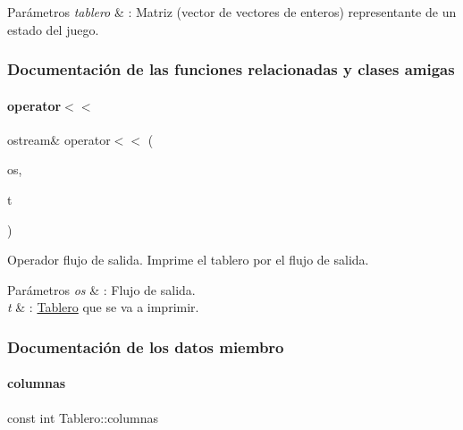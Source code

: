 \begin{DoxyParams}{Parámetros}
{\em tablero} & \+: Matriz (vector de vectores de enteros) representante de un estado del juego. \\
\hline
\end{DoxyParams}


\subsubsection{Documentación de las funciones relacionadas y clases amigas}
\hypertarget{classTablero_a320d149883604290d56f857c9b5bcf1d}{}\label{classTablero_a320d149883604290d56f857c9b5bcf1d} 
\paragraph{\texorpdfstring{operator$<$$<$}{operator<<}}
{\footnotesize\ttfamily ostream\& operator$<$$<$ (\begin{DoxyParamCaption}\item[{ostream \&}]{os,  }\item[{const \hyperlink{classTablero}{Tablero} \&}]{t }\end{DoxyParamCaption})\hspace{0.3cm}{\ttfamily [friend]}}



Operador flujo de salida. Imprime el tablero por el flujo de salida. 


\begin{DoxyParams}{Parámetros}
{\em os} & \+: Flujo de salida. \\
\hline
{\em t} & \+: \hyperlink{classTablero}{Tablero} que se va a imprimir. \\
\hline
\end{DoxyParams}


\subsubsection{Documentación de los datos miembro}
\hypertarget{classTablero_ac70289ec91b44d05da648770cc46801d}{}\label{classTablero_ac70289ec91b44d05da648770cc46801d} 
\paragraph{\texorpdfstring{columnas}{columnas}}
{\footnotesize\ttfamily const int Tablero\+::columnas\hspace{0.3cm}{\ttfamily [private]}}



